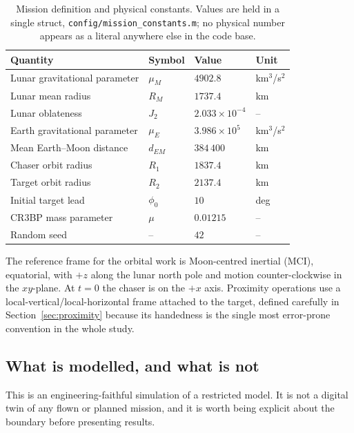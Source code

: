 \begin{table}[htbp]
\centering
\caption{Mission definition and physical constants. Values are held in a single
struct, \texttt{config/mission\_constants.m}; no physical number appears as a
literal anywhere else in the code base.}
\label{tab:mission}
\small
\begin{tabular}{llll}
\toprule
Quantity & Symbol & Value & Unit \\
\midrule
Lunar gravitational parameter & $\mu_M$    & $4902.8$   & km$^3$/s$^2$ \\
Lunar mean radius             & $R_M$      & $1737.4$   & km \\
Lunar oblateness              & $J_2$      & $2.033\times10^{-4}$ & -- \\
Earth gravitational parameter & $\mu_E$    & $3.986\times10^{5}$  & km$^3$/s$^2$ \\
Mean Earth--Moon distance     & $d_{EM}$   & $384\,400$ & km \\
Chaser orbit radius           & $R_1$      & $1837.4$   & km \\
Target orbit radius           & $R_2$      & $2137.4$   & km \\
Initial target lead           & $\phi_0$   & $10$       & deg \\
CR3BP mass parameter          & $\mu$      & $0.01215$  & -- \\
Random seed                   & --         & $42$       & -- \\
\bottomrule
\end{tabular}
\end{table}

The reference frame for the orbital work is Moon-centred inertial (MCI),
equatorial, with $+z$ along the lunar north pole and motion counter-clockwise in
the $xy$-plane. At $t = 0$ the chaser is on the $+x$ axis. Proximity operations
use a local-vertical/local-horizontal frame attached to the target, defined
carefully in Section~\ref{sec:proximity} because its handedness is the single
most error-prone convention in the whole study.

\subsection{What is modelled, and what is not}

This is an engineering-faithful simulation of a restricted model. It is not a
digital twin of any flown or planned mission, and it is worth being explicit
about the boundary before presenting results.

